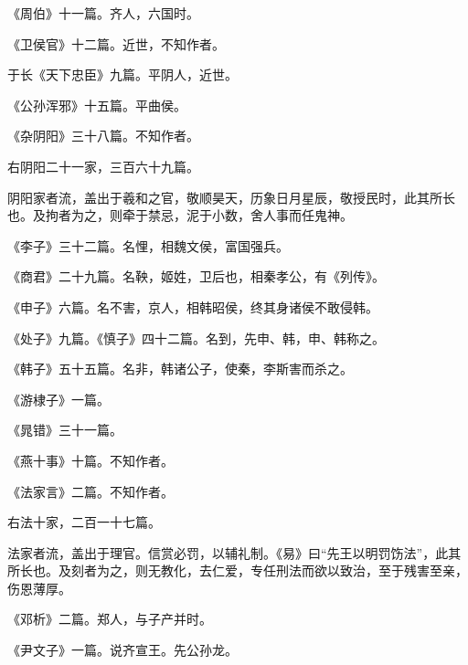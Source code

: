\documentclass[12pt,UTF8]{ctexbook}
\begin{document}
《周伯》十一篇。齐人，六国时。



《卫侯官》十二篇。近世，不知作者。



于长《天下忠臣》九篇。平阴人，近世。



《公孙浑邪》十五篇。平曲侯。



《杂阴阳》三十八篇。不知作者。



右阴阳二十一家，三百六十九篇。



阴阳家者流，盖出于羲和之官，敬顺昊天，历象日月星辰，敬授民时，此其所长也。及拘者为之，则牵于禁忌，泥于小数，舍人事而任鬼神。



《李子》三十二篇。名悝，相魏文侯，富国强兵。



《商君》二十九篇。名鞅，姬姓，卫后也，相秦孝公，有《列传》。



《申子》六篇。名不害，京人，相韩昭侯，终其身诸侯不敢侵韩。



《处子》九篇。《慎子》四十二篇。名到，先申、韩，申、韩称之。



《韩子》五十五篇。名非，韩诸公子，使秦，李斯害而杀之。



《游棣子》一篇。



《晁错》三十一篇。



《燕十事》十篇。不知作者。



《法家言》二篇。不知作者。



右法十家，二百一十七篇。



法家者流，盖出于理官。信赏必罚，以辅礼制。《易》曰“先王以明罚饬法”，此其所长也。及刻者为之，则无教化，去仁爱，专任刑法而欲以致治，至于残害至亲，伤恩薄厚。



《邓析》二篇。郑人，与子产并时。



《尹文子》一篇。说齐宣王。先公孙龙。
\end{document}
